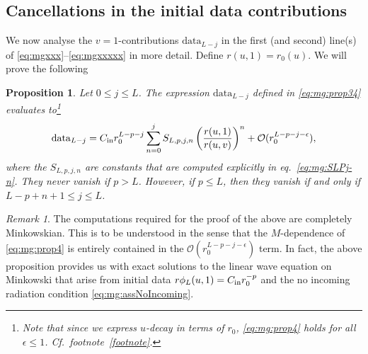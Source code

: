 \documentclass[11pt,english]{article}
\numberwithin{equation}{section}
\theoremstyle{remark}
\newtheorem{rem}{Remark}[section]
\theoremstyle{plain}
\newtheorem{prop}{Proposition}[section]
\theoremstyle{remark}
\renewcommand{\(}{\left(}
\renewcommand{\)}{\right)}
\begin{document}
\subsection{Cancellations in the initial data contributions}\label{sec:mg:datacanc}
We now analyse the $v=1$-contributions $\mathrm{data}_{L-j}$ in the first (and second) line(s)  of \eqref{eq:mgxxx}--\eqref{eq:mgxxxxx} in more detail. 
Define $r(u,1)=r_0(u)$.
We will prove the following 
\begin{prop}\label{prop:mg:prop4}
Let $0\leq j\leq L$. 
The expression $\mathrm{data}_{L-j}$ defined in \eqref{eq:mg:prop34} evaluates to\footnote{Note that since we express $u$-decay  in terms of $r_0$, \eqref{eq:mg:prop4} holds for all $\epsilon \leq 1$. Cf.\ footnote~\ref{footnote}.}
\begin{equation}\label{eq:mg:prop4}
\mathrm{data}_{L-j}=C_{\mathrm{in}} r_0^{L-p-j}\sum_{n=0}^j S_{L,p,j,n}\left(\frac{r(u,1)}{r(u,v)}\right)^n+\mathcal O(r_0^{L-p-j-\epsilon}),
\end{equation}
where the $S_{L,p,j,n}$ are constants that are computed explicitly in eq.\ \eqref{eq:mg:SLPj-n}. They never vanish if $p> L$. However, if $p\leq L$, then they vanish if and only if $L-p+n+1\leq j\leq L$. %
\end{prop}
\begin{rem}
The computations required for the proof of the above are completely Minkowskian. 
This is to be understood in the sense that the $M$-dependence of \eqref{eq:mg:prop4} is entirely  contained in the $\mathcal O(r_0^{L-p-j-\epsilon})$ term. 
In fact, the above proposition provides us with exact solutions to the linear wave equation on Minkowski that arise from initial data $r\phi_L(u,1)=C_{\mathrm{in}} r_0^{-p}$ and the no incoming radiation condition \eqref{eq:mg:assNoIncoming}.
\end{rem}
\end{document}
